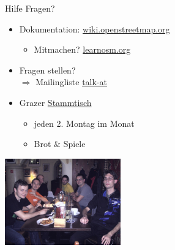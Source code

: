 \documentclass{beamer}
\begin{document}
%
%
%
%
%
%
%
%
%
%
%
%
\begin{frame}{Hilfe}
Fragen? 
\begin{itemize}
  \item Dokumentation: \href{http://wiki.openstreetmap.org}{wiki.openstreetmap.org}
  \begin{itemize} 
    \item Mitmachen? \href{http://learnosm.org/}{learnosm.org}
  \end{itemize}
  \item Fragen stellen? \\ $\Rightarrow$ Mailingliste \href{http://lists.openstreetmap.org/listinfo/talk-at}{talk-at}
\vspace{1cm}
  \item Grazer \href{https://wiki.openstreetmap.org/wiki/Graz/Stammtisch}{Stammtisch}
  \begin{itemize}
      \item jeden 2. Montag im Monat 
      \item Brot $\&$ Spiele
  \end{itemize}

\end{itemize}

 \vspace*{-2.0cm}
\hfill\includegraphics[width=5cm]{Osm_graz_members_2011.jpeg}

\end{frame}
\end{document}
